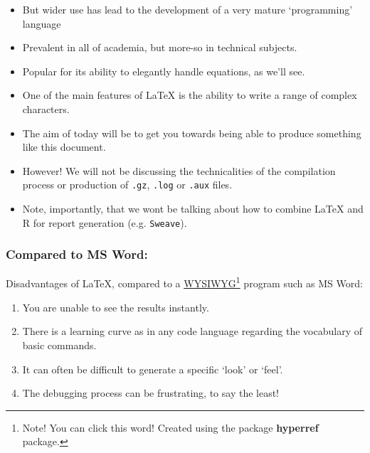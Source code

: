 \documentclass[a4paper, 12pt]{article}
\begin{document}
 \begin{itemize}
\item But wider use has lead to the development of a very mature `programming' language
\item Prevalent in all of academia, but more-so in technical subjects.
\item Popular for its ability to elegantly handle equations, as we'll see.
\item One of the main features of \LaTeX{} is the ability to write a range of complex characters.

\item The aim of today will be to get you towards being able to produce something like this document.
\item However! We will not be discussing the technicalities of the compilation process or production of \texttt{.gz}, \texttt{.log} or \texttt{.aux} files.
\item Note, importantly, that we wont be talking about how to combine LaTeX and R for report generation (e.g. \texttt{Sweave}).
\end{itemize}

\subsubsection{Compared to MS Word:}

Disadvantages of \LaTeX{}, compared to a \color{red} \href{http://en.wikipedia.org/wiki/WYSIWYG}{WYSIWYG}\footnote{Note! You can click this word! Created using the package \small \textbf{hyperref} \normalsize package.} \color{black} program such as MS Word:
\begin{enumerate}							%
\item You are unable to see the results instantly.
\item There is a learning curve as in any code language regarding the vocabulary of basic commands.
\item It can often be difficult to generate a specific `look' or `feel'.
\item The debugging process can be frustrating, to say the least!
\end{enumerate}
\end{document}
